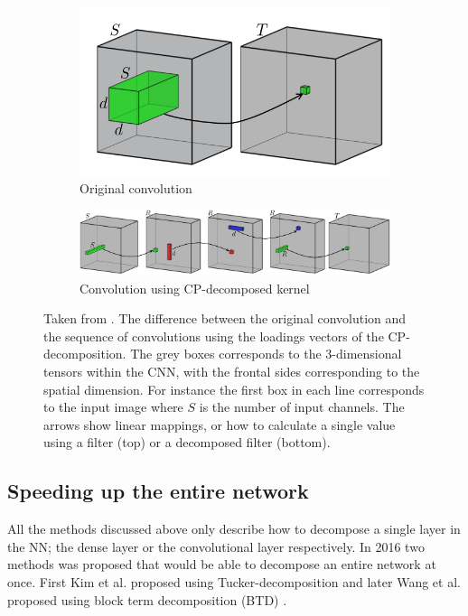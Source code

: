 \begin{figure}
    \centering
    \begin{subfigure}{\linewidth}
        \centering
        \includegraphics[width=0.4\linewidth]{Pics/02_Previous_work/fullConv.png}
        \caption{Original convolution}
    \end{subfigure}
    \begin{subfigure}{\linewidth}
        \centering
        \includegraphics[width=\linewidth]{Pics/02_Previous_work/decompConv.png}
        \caption{Convolution using CP-decomposed kernel}
    \end{subfigure}
    \caption{Taken from \cite{Lebedev2015}. The difference between the original convolution and the sequence of convolutions using the loadings vectors of the CP-decomposition. The grey boxes corresponds to the 3-dimensional tensors within the CNN, with the frontal sides corresponding to the spatial dimension. For instance the first box in each line corresponds to the input image where $S$ is the number of input channels. The arrows show linear mappings, or how to calculate a single value using a filter (top) or a decomposed filter (bottom).}
    \label{fig:decompConvDifference}
\end{figure}

\subsection{Speeding up the entire network}
All the methods discussed above only describe how to decompose a single layer in the NN; the dense layer or the convolutional layer respectively. In 2016 two methods was proposed that would be able to decompose an entire network at once. First Kim et al. proposed using Tucker-decomposition \cite{Kim2016} and later Wang et al. proposed using block term decomposition (BTD) \cite{Wang2016}. 

